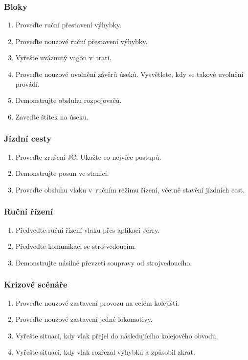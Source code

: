 \documentclass[12pt,a4paper]{article}
\begin{document}
\subsubsection*{Bloky}
\begin{enumerate}[leftmargin=*]
\item Proveďte ruční přestavení výhybky.
\item Proveďte nouzové ruční přestavení výhybky.
\item Vyřešte uváznutý vagón v~trati.
\item Proveďte nouzové uvolnění závěrů úseků. Vysvětlete, kdy se takové uvolnění
provádí.
\item Demonstrujte obsluhu rozpojovačů.
\item Zaveďte štítek na úseku.
\end{enumerate}

\subsubsection*{Jízdní cesty}
\begin{enumerate}[leftmargin=*]
\item Proveďte zrušení JC. Ukažte co nejvíce postupů.
\item Demonstrujte posun ve stanici.
\item Proveďte obsluhu vlaku v~ručním režimu řízení, včetně stavění jízdních
cest.
\end{enumerate}

\subsubsection*{Ruční řízení}
\begin{enumerate}[leftmargin=*]
\item Předveďte ruční řízení vlaku přes aplikaci Jerry.
\item Předveďte komunikaci se strojvedoucím.
\item Demonstrujte násilné převzetí soupravy od strojvedoucího.
\end{enumerate}

\subsubsection*{Krizové scénáře}
\begin{enumerate}[leftmargin=*]
\item Proveďte nouzové zastavení provozu na celém kolejišti.
\item Proveďte nouzové zastavení jedné lokomotivy.
\item Vyřešte situaci, kdy vlak přejel do následujícího kolejového obvodu.
\item Vyřešte situaci, kdy vlak rozřezal výhybku a způsobil zkrat.
\end{enumerate}
\end{document}
